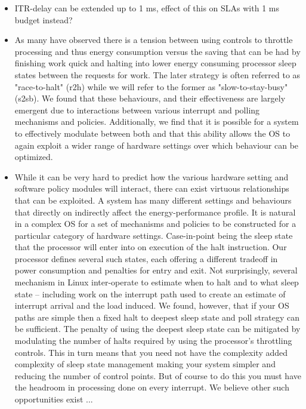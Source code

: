 \label{sec:dis}

\begin{itemize}
    \item ITR-delay can be extended up to 1 ms, effect of this on SLAs with 1 ms budget instead?
    \item As many have observed there is a tension between using controls to throttle processing and thus energy consumption versus the saving that can be had by finishing work quick and halting into lower energy consuming processor sleep states between the requests for work.  The later strategy is often referred to as "race-to-halt" (r2h) while we will refer to the former as "slow-to-stay-busy" (s2sb).  We found that these behaviours, and their effectiveness are largely emergent due to interactions between various interrupt and polling mechanisms and policies.  Additionally, we find that it is possible for a system to effectively modulate between both and that this ability allows the OS to again exploit a wider range of hardware settings over which behaviour can be optimized.
    \item While it can be very hard to predict how the various hardware setting and software policy modules will interact, there can exist virtuous relationships that can be exploited. A system has many different settings and behaviours that directly on indirectly affect the energy-performance profile.  It is natural in a complex OS for a set of mechanisms and policies to be constructed for a particular category of hardware settings.  Case-in-point being the sleep state that the processor will enter into on execution of the halt instruction.  Our processor defines several such states, each offering a different tradeoff in power consumption and penalties for entry and exit.  Not surprisingly, several mechanism in Linux inter-operate to estimate when to halt and to what sleep state -- including work on the interrupt path used to create an estimate of interrupt arrival and the load induced.  We found, however, that if your OS paths are simple then a fixed halt to deepest sleep state and poll strategy can be sufficient.  The penalty of using the deepest sleep state can be mitigated by modulating the number of halts required by using the processor's throttling controls.   This in turn means that you need not have the complexity added complexity of sleep state management making your system simpler and reducing the number of control points.  But of course to do this you must have the headroom in processing done on every interrupt.   We believe other such opportunities exist ...
\end{itemize}

